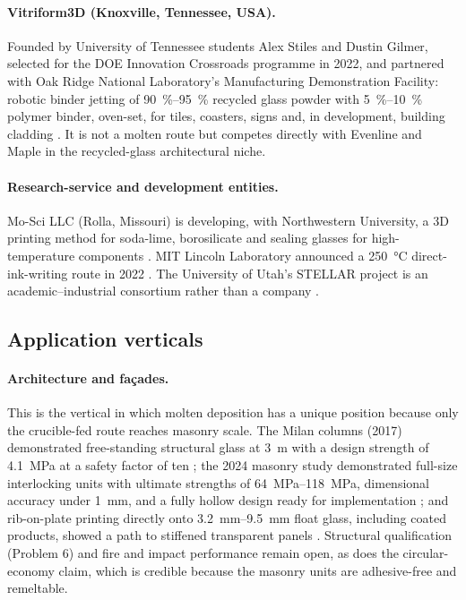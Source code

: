 \paragraph{Vitriform3D (Knoxville, Tennessee, USA).} Founded by University of Tennessee students Alex Stiles and Dustin Gilmer, selected for the DOE Innovation Crossroads programme in 2022, and partnered with Oak Ridge National Laboratory's Manufacturing Demonstration Facility: robotic binder jetting of \SIrange{90}{95}{\percent} recycled glass powder with \SIrange{5}{10}{\percent} polymer binder, oven-set, for tiles, coasters, signs and, in development, building cladding \citep{ornl2026}. It is not a molten route but competes directly with Evenline and Maple in the recycled-glass architectural niche.

\paragraph{Research-service and development entities.} Mo-Sci LLC (Rolla, Missouri) is developing, with Northwestern University, a 3D printing method for soda-lime, borosilicate and sealing glasses for high-temperature components \citep{mosci_web}. MIT Lincoln Laboratory announced a \SI{250}{\celsius} direct-ink-writing route in 2022 \citep{acers2024recent}. The University of Utah's STELLAR project is an academic--industrial consortium rather than a company \citep{utah2025}.

\subsection{Application verticals}
\paragraph{Architecture and fa\c{c}ades.} This is the vertical in which molten deposition has a unique position because only the crucible-fed route reaches masonry scale. The Milan columns (2017) demonstrated free-standing structural glass at \SI{3}{m} with a design strength of \SI{4.1}{MPa} at a safety factor of ten \citep{inamura2018}; the 2024 masonry study demonstrated full-size interlocking units with ultimate strengths of \SIrange{64}{118}{MPa}, dimensional accuracy under \SI{1}{mm}, and a fully hollow design ready for implementation \citep{mit2024masonry}; and rib-on-plate printing directly onto \SIrange{3.2}{9.5}{mm} float glass, including coated products, showed a path to stiffened transparent panels \citep{stern2024cgc}. Structural qualification (Problem 6) and fire and impact performance remain open, as does the circular-economy claim, which is credible because the masonry units are adhesive-free and remeltable.

